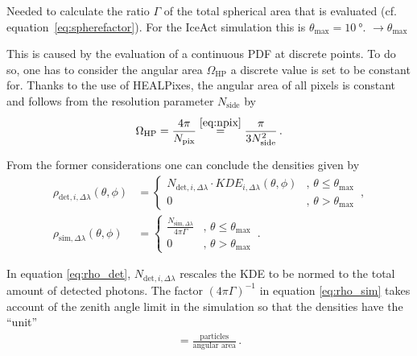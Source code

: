 Needed to calculate the ratio $\Gamma$ of the total spherical area that is evaluated (cf. equation~\eqref{eq:spherefactor}). For the IceAct simulation this is $\theta_\text{max} = \SI{10}{\degree}$. $\rightarrow \theta_\text{max}$

This is caused by the evaluation of a continuous PDF at discrete points. To do so, one has to consider the angular area $\Omega_\text{HP}$ a discrete value is set to be constant for. Thanks to the use of HEALPixes, the angular area of all pixels is constant and follows from the resolution parameter $N_\text{side}$ by
\begin{align}
	\Omega_\text{HP} = \frac{4\pi}{N_\text{pix}} \overset{\eqref{eq:npix}}{=} \frac{\pi}{3N_\text{side}^2}\,.
	\label{eq:omega_hp}
\end{align}

From the former considerations one can conclude the densities given by
\begin{subequations}
	\begin{align}
		\rho_{\text{det},i,\Delta\lambda}(\theta,\phi) &= 
		\begin{cases}
			N_{\text{det},i,\Delta\lambda}\cdot KDE_{i,\Delta\lambda}(\theta,\phi) & ,\,\theta\leq\theta_\text{max}\\
			0 & ,\, \theta > \theta_\text{max}
		\end{cases}\,,
		\label{eq:rho_det}
		\\
		\rho_{\text{sim},\Delta\lambda}(\theta,\phi) &= 
		\begin{cases}
			\frac{N_{\text{sim},\Delta\lambda}}{4\pi\Gamma} & ,\,\theta\leq\theta_\text{max}\\
			0 & ,\, \theta > \theta_\text{max}
		\end{cases}\,.
		\label{eq:rho_sim}
	\end{align}
\end{subequations}

In equation \eqref{eq:rho_det}, $N_{\text{det},i,\Delta\lambda}$ rescales the KDE to be normed to the total amount of detected photons. The factor $(4\pi\Gamma)^{-1}$ in equation \eqref{eq:rho_sim} takes account of the zenith angle limit in the simulation so that the densities have the \enquote{unit}
\begin{align}
	[\rho] = \frac{\text{particles}}{\text{angular area}}\,.
\end{align}

